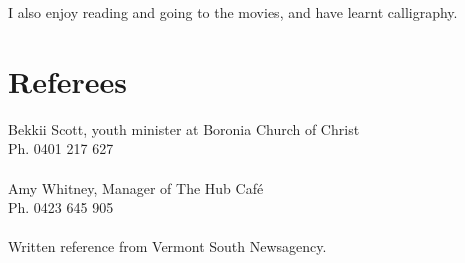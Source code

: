 \documentclass[a4paper]{article}
\begin{document}
I also enjoy reading and going to the movies, and have learnt calligraphy.



\section{Referees}
Bekkii Scott, youth minister at Boronia Church of Christ \\
Ph. 0401 217 627\\ \\
Amy Whitney, Manager of The Hub Caf\'e \\
Ph. 0423 645 905\\ \\
Written reference from Vermont South Newsagency.

\end{document}

